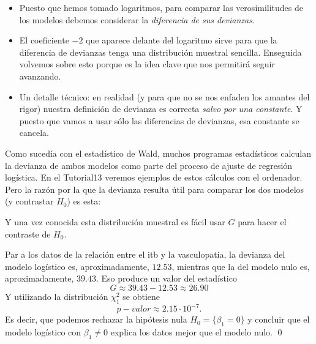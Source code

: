 \begin{itemize}
	\item Puesto que hemos tomado logaritmos, para comparar las verosimilitudes de los modelos debemos considerar la {\em diferencia de sus devianzas.}
	\item El coeficiente $-2$ que aparece delante del logaritmo sirve para que la diferencia de devianzas tenga una distribución muestral sencilla. Enseguida volvemos sobre esto porque es la idea clave que nos permitirá seguir avanzando.
	\item Un detalle técnico: en realidad (y para que no se nos enfaden los amantes del rigor) nuestra definición de devianza es correcta {\em salvo por una constante}. Y puesto que vamos a usar sólo las diferencias de devianzas, esa constante se cancela.
\end{itemize}

Como sucedía con el estadístico de Wald, muchos programas estadísticos calculan la devianza de ambos modelos como parte del proceso de ajuste de regresión logística.  En el Tutorial13 veremos ejemplos de estos cálculos con el ordenador. Pero la razón por la que la devianza resulta útil para comparar los dos modelos (y contrastar $H_0$) es esta:
\begin{center}
	\end{center}
	
Y una vez conocida esta distribución muestral es fácil usar $G$ para hacer el contraste de $H_0$. 	

\begin{ejemplo}
\label{cap13:ejem:contrasteBeta1vasculopatia}	
Par a los datos de la relación entre el itb y la vasculopatía, la devianza del modelo logístico es, aproximadamente, $12.53$, mientras que la del modelo nulo es, aproximadamente, $39.43$. Eso produce un valor del estadístico
\[
G \approx  39.43 - 12.53 \approx 26.90
\]	
Y utilizando la distribución $\chi^2_1$ se obtiene
\[p-valor \approx 2.15\cdot 10^{-7}.\]
Es decir, que podemos rechazar la hipótesis nula $H_0 = \{\beta_1 = 0\}$ y concluir que el modelo logístico con $\beta_1\neq 0$ explica los datos mejor que el modelo nulo.
\qed
\end{ejemplo}



